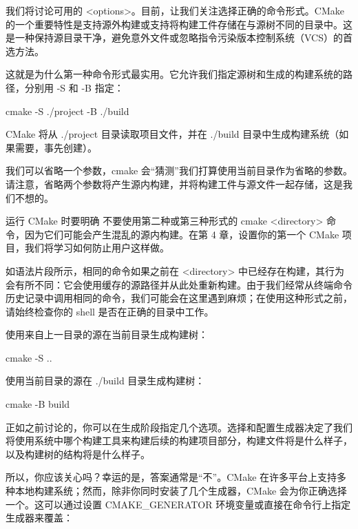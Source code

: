 我们将讨论可用的 <options>。目前，让我们关注选择正确的命令形式。CMake 的一个重要特性是支持源外构建或支持将构建工件存储在与源树不同的目录中。这是一种保持源目录干净，避免意外文件或忽略指令污染版本控制系统（VCS）的首选方法。

这就是为什么第一种命令形式最实用。它允许我们指定源树和生成的构建系统的路径，分别用 -S 和 -B 指定：

\begin{shell}
cmake -S ./project -B ./build
\end{shell}

CMake 将从 ./project 目录读取项目文件，并在 ./build 目录中生成构建系统（如果需要，事先创建）。

我们可以省略一个参数，cmake 会“猜测”我们打算使用当前目录作为省略的参数。请注意，省略两个参数将产生源内构建，并将构建工件与源文件一起存储，这是我们不想的。

\begin{myNotic}{运行 CMake 时要明确}
不要使用第二种或第三种形式的 cmake <directory> 命令，因为它们可能会产生混乱的源内构建。在第 4 章，设置你的第一个 CMake 项目，我们将学习如何防止用户这样做。

如语法片段所示，相同的命令如果之前在 <directory> 中已经存在构建，其行为会有所不同：它会使用缓存的源路径并从此处重新构建。由于我们经常从终端命令历史记录中调用相同的命令，我们可能会在这里遇到麻烦；在使用这种形式之前，请始终检查你的 shell 是否在正确的目录中工作。
\end{myNotic}


使用来自上一目录的源在当前目录生成构建树：

\begin{shell}
cmake -S ..
\end{shell}

使用当前目录的源在 ./build 目录生成构建树：

\begin{shell}
cmake -B build
\end{shell}


正如之前讨论的，你可以在生成阶段指定几个选项。选择和配置生成器决定了我们将使用系统中哪个构建工具来构建后续的构建项目部分，构建文件将是什么样子，以及构建树的结构将是什么样子。

所以，你应该关心吗？幸运的是，答案通常是“不”。CMake 在许多平台上支持多种本地构建系统；然而，除非你同时安装了几个生成器，CMake 会为你正确选择一个。这可以通过设置 CMAKE\_GENERATOR 环境变量或直接在命令行上指定生成器来覆盖：

